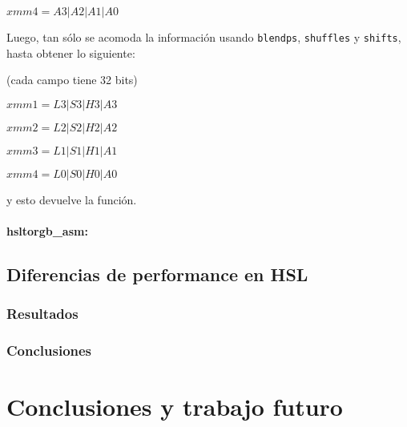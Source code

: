 \documentclass[a4paper]{article}
\begin{document}
$xmm4 = A3|A2|A1|A0$

\vspace*{0.3cm}

Luego, tan sólo se acomoda la información usando {\tt blendps}, {\tt shuffles} y {\tt shifts}, hasta obtener lo siguiente:

 \vspace*{0.3cm}

(cada campo tiene 32 bits)	
	
\vspace*{0.3cm}	

$xmm1 = L3|S3|H3|A3$

\vspace*{0.3cm}

$xmm2 = L2|S2|H2|A2$

\vspace*{0.3cm}

$xmm3 = L1|S1|H1|A1$

\vspace*{0.3cm}

$xmm4 = L0|S0|H0|A0$

\vspace*{0.3cm}

y esto devuelve la función.

\paragraph*{hsltorgb_asm:}




\subsection{Diferencias de performance en HSL}

\subsubsection{Resultados}

\subsubsection{Conclusiones}


\newpage
\section{Conclusiones y trabajo futuro}
\end{document}

